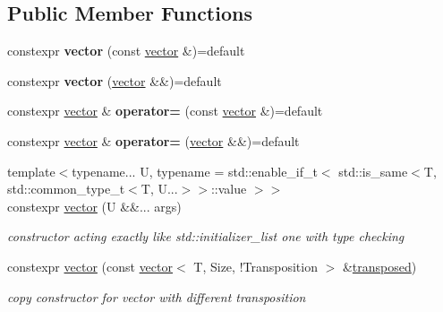 \subsection*{Public Member Functions}
\begin{DoxyCompactItemize}
\item 
\mbox{\label{classnumpp_1_1vector_ad80c07beed6f1f5e24cd5b1b59e71938}} 
constexpr {\bfseries vector} (const \hyperlink{classnumpp_1_1vector}{vector} \&)=default
\item 
\mbox{\label{classnumpp_1_1vector_aaa6ad1b5e7c8f71ff460c296486419a6}} 
constexpr {\bfseries vector} (\hyperlink{classnumpp_1_1vector}{vector} \&\&)=default
\item 
\mbox{\label{classnumpp_1_1vector_a2106f202b6dcf228cbd5c9c5eac519d6}} 
constexpr \hyperlink{classnumpp_1_1vector}{vector} \& {\bfseries operator=} (const \hyperlink{classnumpp_1_1vector}{vector} \&)=default
\item 
\mbox{\label{classnumpp_1_1vector_aea654c76b157b8e826b15ef7da7bccec}} 
constexpr \hyperlink{classnumpp_1_1vector}{vector} \& {\bfseries operator=} (\hyperlink{classnumpp_1_1vector}{vector} \&\&)=default
\item 
\mbox{\label{classnumpp_1_1vector_aa56375d25f669ed670c3d04b844e8424}} 
{\footnotesize template$<$typename... U, typename  = std\+::enable\+\_\+if\+\_\+t$<$						std\+::is\+\_\+same$<$\+T, std\+::common\+\_\+type\+\_\+t$<$\+T, U...$>$$>$\+::value					$>$$>$ }\\constexpr \hyperlink{classnumpp_1_1vector_aa56375d25f669ed670c3d04b844e8424}{vector} (U \&\&... args)
\begin{DoxyCompactList}\small\item\em constructor acting exactly like std\+::initializer\+\_\+list one with type checking \end{DoxyCompactList}\item 
constexpr \hyperlink{classnumpp_1_1vector_ac94f1a73274a498f76425a84cf6e395b}{vector} (const \hyperlink{classnumpp_1_1vector}{vector}$<$ T, Size, !Transposition $>$ \&\hyperlink{classnumpp_1_1vector_a81037f5cce7bd02354efe8b967c191bf}{transposed})
\begin{DoxyCompactList}\small\item\em copy constructor for vector with different transposition \end{DoxyCompactList}\item 

\end{DoxyCompactItemize}
